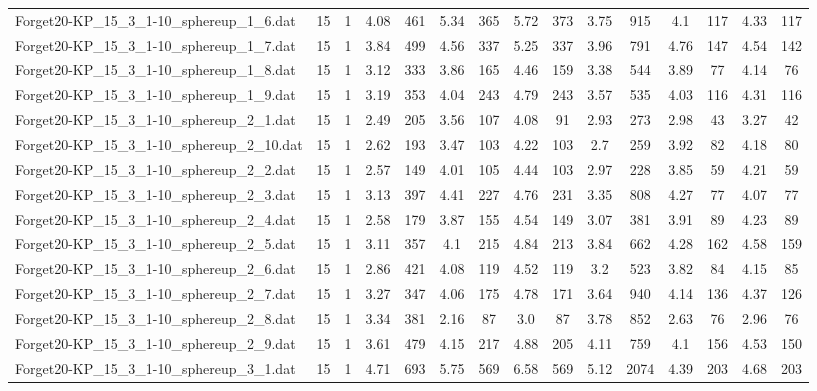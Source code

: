 \begin{table}[!ht]
{\begin{tabular}{lcccccccccccccc}
Forget20-KP\_15\_3\_1-10\_sphereup\_1\_6.dat & 15 & 1 & 4.08 & 461 & 5.34 & 365 & 5.72 & 373 & 3.75 & 915 & 4.1 & 117 & 4.33 & 117 \\
Forget20-KP\_15\_3\_1-10\_sphereup\_1\_7.dat & 15 & 1 & 3.84 & 499 & 4.56 & 337 & 5.25 & 337 & 3.96 & 791 & 4.76 & 147 & 4.54 & 142 \\
Forget20-KP\_15\_3\_1-10\_sphereup\_1\_8.dat & 15 & 1 & 3.12 & 333 & 3.86 & 165 & 4.46 & 159 & 3.38 & 544 & 3.89 & 77 & 4.14 & 76 \\
Forget20-KP\_15\_3\_1-10\_sphereup\_1\_9.dat & 15 & 1 & 3.19 & 353 & 4.04 & 243 & 4.79 & 243 & 3.57 & 535 & 4.03 & 116 & 4.31 & 116 \\
Forget20-KP\_15\_3\_1-10\_sphereup\_2\_1.dat & 15 & 1 & 2.49 & 205 & 3.56 & 107 & 4.08 & 91 & 2.93 & 273 & 2.98 & 43 & 3.27 & 42 \\
Forget20-KP\_15\_3\_1-10\_sphereup\_2\_10.dat & 15 & 1 & 2.62 & 193 & 3.47 & 103 & 4.22 & 103 & 2.7 & 259 & 3.92 & 82 & 4.18 & 80 \\
Forget20-KP\_15\_3\_1-10\_sphereup\_2\_2.dat & 15 & 1 & 2.57 & 149 & 4.01 & 105 & 4.44 & 103 & 2.97 & 228 & 3.85 & 59 & 4.21 & 59 \\
Forget20-KP\_15\_3\_1-10\_sphereup\_2\_3.dat & 15 & 1 & 3.13 & 397 & 4.41 & 227 & 4.76 & 231 & 3.35 & 808 & 4.27 & 77 & 4.07 & 77 \\
Forget20-KP\_15\_3\_1-10\_sphereup\_2\_4.dat & 15 & 1 & 2.58 & 179 & 3.87 & 155 & 4.54 & 149 & 3.07 & 381 & 3.91 & 89 & 4.23 & 89 \\
Forget20-KP\_15\_3\_1-10\_sphereup\_2\_5.dat & 15 & 1 & 3.11 & 357 & 4.1 & 215 & 4.84 & 213 & 3.84 & 662 & 4.28 & 162 & 4.58 & 159 \\
Forget20-KP\_15\_3\_1-10\_sphereup\_2\_6.dat & 15 & 1 & 2.86 & 421 & 4.08 & 119 & 4.52 & 119 & 3.2 & 523 & 3.82 & 84 & 4.15 & 85 \\
Forget20-KP\_15\_3\_1-10\_sphereup\_2\_7.dat & 15 & 1 & 3.27 & 347 & 4.06 & 175 & 4.78 & 171 & 3.64 & 940 & 4.14 & 136 & 4.37 & 126 \\
Forget20-KP\_15\_3\_1-10\_sphereup\_2\_8.dat & 15 & 1 & 3.34 & 381 & 2.16 & 87 & 3.0 & 87 & 3.78 & 852 & 2.63 & 76 & 2.96 & 76 \\
Forget20-KP\_15\_3\_1-10\_sphereup\_2\_9.dat & 15 & 1 & 3.61 & 479 & 4.15 & 217 & 4.88 & 205 & 4.11 & 759 & 4.1 & 156 & 4.53 & 150 \\
Forget20-KP\_15\_3\_1-10\_sphereup\_3\_1.dat & 15 & 1 & 4.71 & 693 & 5.75 & 569 & 6.58 & 569 & 5.12 & 2074 & 4.39 & 203 & 4.68 & 203 \\

\end{tabular}}
\end{table}
